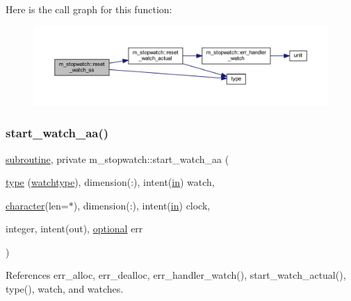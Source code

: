 Here is the call graph for this function\+:
\nopagebreak
\begin{figure}[H]
\begin{center}
\leavevmode
\includegraphics[width=350pt]{namespacem__stopwatch_a547e3482f3b6f3ff40e9d2f178f73095_cgraph}
\end{center}
\end{figure}
\mbox{\label{namespacem__stopwatch_ab76844fff5eb77d00bf4db5516902414}} 
\subsubsection{\texorpdfstring{start\+\_\+watch\+\_\+aa()}{start\_watch\_aa()}}
{\footnotesize\ttfamily \hyperlink{M__stopwatch_83_8txt_acfbcff50169d691ff02d4a123ed70482}{subroutine}, private m\+\_\+stopwatch\+::start\+\_\+watch\+\_\+aa (\begin{DoxyParamCaption}\item[{\hyperlink{stop__watch_83_8txt_a70f0ead91c32e25323c03265aa302c1c}{type} (\hyperlink{structm__stopwatch_1_1watchtype}{watchtype}), dimension(\+:), intent(\hyperlink{M__journal_83_8txt_afce72651d1eed785a2132bee863b2f38}{in})}]{watch,  }\item[{\hyperlink{option__stopwatch_83_8txt_abd4b21fbbd175834027b5224bfe97e66}{character}(len=$\ast$), dimension(\+:), intent(\hyperlink{M__journal_83_8txt_afce72651d1eed785a2132bee863b2f38}{in})}]{clock,  }\item[{integer, intent(out), \hyperlink{option__stopwatch_83_8txt_aa4ece75e7acf58a4843f70fe18c3ade5}{optional}}]{err }\end{DoxyParamCaption})\hspace{0.3cm}{\ttfamily [private]}}



References err\+\_\+alloc, err\+\_\+dealloc, err\+\_\+handler\+\_\+watch(), start\+\_\+watch\+\_\+actual(), type(), watch, and watches.

